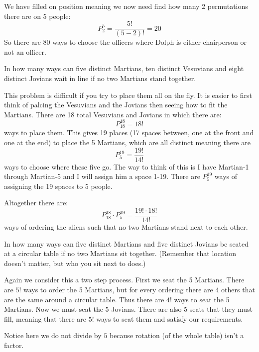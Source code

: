 \documentclass[addpoints]{exam}
\begin{document}
\begin{questions}
\begin{parts}
\begin{solution}
      We have filled on position meaning we now need find how many 2 permutations there are on 5 people:
      \[
        P^5_2 = \frac{5!}{(5-2)!} = 20
      \]
      So there are 80 ways to choose the officers where Dolph is either chairperson or not an officer.
    \end{solution}
  \end{parts}


  \question In how many ways can five distinct Martians, ten distinct Vesuvians and eight distinct Jovians wait in line if no two Martians stand together.
  \vspace*{\fill}
  \begin{solution}
    This problem is difficult if you try to place them all on the fly. It is easier to first think of palcing the Vesuvians and the Jovians then seeing how to fit the Martians. There are 18 total Vesuvians and Jovians in which there are:
    \[
      P^{18}_{18} = 18!
    \]
    ways to place them. This gives 19 places (17 spaces between, one at the front and one at the end) to place the 5 Martians, which are all distinct meaning there are
    \[
      P^{19}_5 = \frac{19!}{14!}
    \]
    ways to choose where these five go. The way to think of this is I have Martian-1 through Martian-5 and I will assign him a space 1-19. There are $P^{19}_5$ ways of assigning the 19 spaces to 5 people.

    Altogether there are:
    \[
      P^{18}_{18}\cdot P^{19}_5 = \frac{19!\cdot 18!}{14!}
    \]
    ways of ordering the aliens such that no two Martians stand next to each other.
  \end{solution}

  \question In how many ways can five distinct Martians and five distinct Jovians be seated at a circular table if no two Martians sit together. (Remember that location doesn't matter, but who you sit next to does.)
  \vspace*{\fill}
  \begin{solution}
    Again we consider this a two step process. First we seat the 5 Martians. There are $5!$ ways to order the 5 Martians, but for every ordering there are 4 others that are the same around a circular table. Thus there are $4!$ ways to seat the 5 Martians. Now we must seat the 5 Jovians. There are also 5 seats that they must fill, meaning that there are $5!$ ways to seat them and satisfy our requirements.

    Notice here we do not divide by $5$ because rotation (of the whole table) isn't a factor.


\end{solution}
\end{questions}
\end{document}
